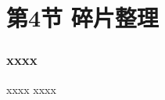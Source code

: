 \section{第4节 碎片整理}%
\begin{frame}[plain,t]
    
    \frametitle{xxxx}
    
    
    \begin{block}{xxxx}
        xxxx

    \end{block} 
    
    
    \begin{figure}
        \centering
    \end{figure}
    
\end{frame}



